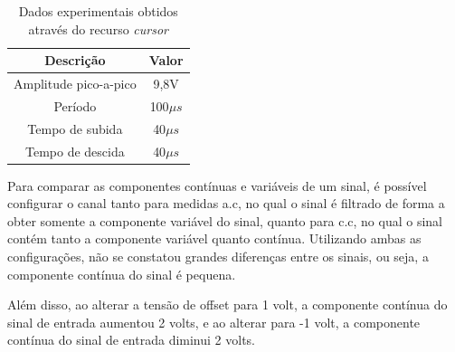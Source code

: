 \documentclass[a4paper]{article} %
\begin{document}
\begin{table}[h]
\begin{centering}
\caption{Dados experimentais obtidos através do recurso \textit{cursor} \label{tab:cursors}}

\begin{tabular}{cc}
\hline 
Descrição & Valor\tabularnewline
\hline
Amplitude pico-a-pico & 9,8V\tabularnewline
Período & 100$\mu s$\tabularnewline
Tempo de subida & 40$\mu s$\tabularnewline
Tempo de descida  & 40$\mu s$\tabularnewline
\hline
\end{tabular}
\par\end{centering}

\end{table}

Para comparar as componentes contínuas e variáveis de um sinal, é possível configurar o canal tanto para medidas a.c, no qual o sinal é filtrado de forma a obter somente a componente variável do sinal, quanto para c.c, no qual o sinal contém tanto a componente variável quanto contínua. Utilizando ambas as configurações, não se constatou grandes diferenças entre os sinais, ou seja, a componente contínua do sinal é pequena. 

Além disso, ao alterar a tensão de offset para 1 volt, a componente contínua do sinal de entrada aumentou 2 volts, e ao alterar para -1 volt, a componente contínua do sinal de entrada diminui 2 volts. 
\end{document}
